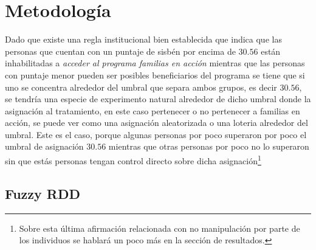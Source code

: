 \documentclass[AER]{AEA}
\begin{document}

\section{Metodología}

Dado que existe una regla institucional bien establecida que indica que las personas que cuentan con un puntaje de sisbén por encima de $30.56$ están inhabilitadas a \textit{acceder al programa familias en acción} mientras que las personas con puntaje menor pueden ser posibles beneficiarios del programa se tiene que si uno se concentra alrededor del umbral que separa ambos grupos, es decir $30.56$, se tendría una especie de experimento natural alrededor de dicho umbral donde la asignación al tratamiento, en este caso pertenecer o no pertenecer a familias en acción, se puede ver como una asignación aleatorizada o una loteria alrededor del umbral. Este es el caso, porque algunas personas por poco superaron por poco el umbral de asignación $30.56$ mientras que otras personas por poco no lo superaron sin que estás personas tengan control directo sobre dicha asignación\footnote{Sobre esta última afirmación relacionada con no manipulación por parte de los individuos se hablará un poco más en la sección de resultados.}

\subsection{Fuzzy RDD}
\end{document}
